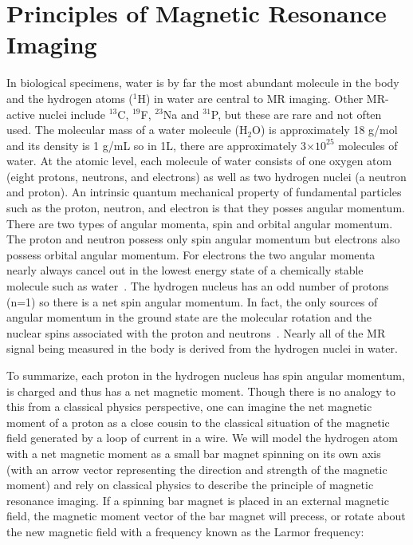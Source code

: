 \section{Principles of Magnetic Resonance Imaging}

In biological specimens, water is by far the most abundant molecule in the body and the hydrogen atoms ($^{1}$H) in water are central to MR imaging.
Other MR-active nuclei include $^{13}$C, $^{19}$F, $^{23}$Na and $^{31}$P, but these are rare and not often used.
The molecular mass of a water molecule (H$_2$O) is approximately 18 g/mol and its density is 1 g/mL so in 1L, there are approximately 3$\times10^{25}$ molecules of water.
At the atomic level, each molecule of water consists of one oxygen atom (eight protons, neutrons, and electrons) as well as two hydrogen nuclei (a neutron and proton).
An intrinsic quantum mechanical property of fundamental particles such as the proton, neutron, and electron is that they posses angular momentum.
There are two types of angular momenta, spin and orbital angular momentum.
The proton and neutron possess only spin angular momentum but electrons also possess orbital angular momentum.
For electrons the two angular momenta nearly always cancel out in the lowest energy state of a chemically stable molecule such as water~\cite{Levitt:2001wo}.
The hydrogen nucleus has an odd number of protons (n=1) so there is a net spin angular momentum.
In fact, the only sources of angular momentum in the ground state are the molecular rotation and the nuclear spins associated with the proton and neutrons~\cite{Levitt:2001wo}.
Nearly all of the MR signal being measured in the body is derived from the hydrogen nuclei in water.

To summarize, each proton in the hydrogen nucleus has spin angular momentum, is charged and thus has a net magnetic moment.
Though there is no analogy to this from a classical physics perspective, one can imagine the net magnetic moment of a proton as a close cousin to the classical situation of the magnetic field generated by a loop of current in a wire.
We will model the hydrogen atom with a net magnetic moment as a small bar magnet spinning on its own axis (with an arrow vector representing the direction and strength of the magnetic moment) and rely on classical physics to describe the principle of magnetic resonance imaging. 
If a spinning bar magnet is placed in an external magnetic field, the magnetic moment vector of the bar magnet will precess, or rotate about the new magnetic field with a frequency known as the Larmor frequency:

